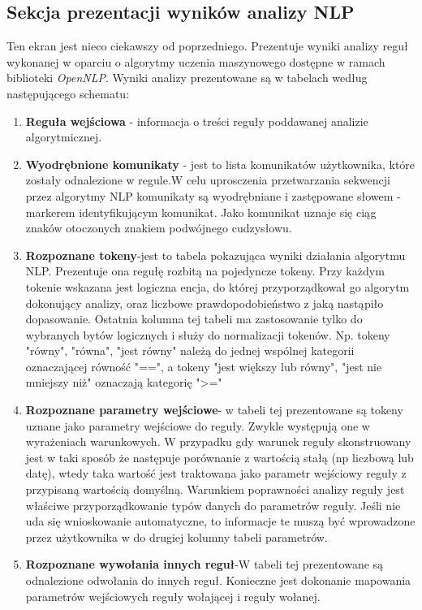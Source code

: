 \subsection{Sekcja prezentacji wyników analizy NLP}
Ten ekran jest nieco ciekawszy od poprzedniego. Prezentuje wyniki analizy reguł wykonanej w
oparciu o algorytmy uczenia maszynowego dostępne w ramach biblioteki \textit{OpenNLP}.
Wyniki analizy prezentowane są w tabelach według następującego schematu:

\begin{enumerate}
	\item \textbf{Reguła wejściowa} - informacja o treści reguły poddawanej analizie algorytmicznej.
	\item	\textbf{Wyodrębnione komunikaty} - jest to lista komunikatów użytkownika, które zostały odnalezione w regule.W celu uprosczenia przetwarzania sekwencji przez algorytmy NLP komunikaty są wyodrębniane i zastępowane
	słowem - markerem identyfikującym komunikat. Jako komunikat uznaje się ciąg znaków otoczonych znakiem podwójnego cudzysłowu.
	\item \textbf{Rozpoznane tokeny}-jest to tabela pokazująca wyniki działania algorytmu NLP. Prezentuje ona regułę rozbitą na pojedyncze tokeny.
	Przy każdym tokenie  wskazana jest logiczna encja, do której przyporządkował go algorytm dokonujący analizy, oraz liczbowe prawdopodobieństwo z jaką nastąpiło dopasowanie.
	Ostatnia kolumna tej tabeli ma zastosowanie tylko do wybranych bytów logicznych i służy do normalizacji tokenów. Np. tokeny "równy", "równa", "jest równy" należą do jednej wspólnej kategorii oznaczającej równość "==", a tokeny "jest większy lub równy", "jest nie mniejszy niż" oznaczają kategorię ">="
	\item \textbf{Rozpoznane parametry wejściowe}- w tabeli tej prezentowane są tokeny uznane jako parametry wejściowe do reguły. Zwykle występują one w wyrażeniach warunkowych.
	W przypadku gdy warunek reguły skonstruowany jest w taki sposób że następuje porównanie z wartością stałą (np liczbową lub datę), wtedy taka wartość jest traktowana jako parametr wejściowy reguły z przypisaną wartością domyślną.
	Warunkiem poprawności analizy reguły jest właściwe przyporządkowanie typów danych do parametrów reguły. Jeśli nie uda się wnioskowanie automatyczne, to informacje te muszą być wprowadzone przez użytkownika w do drugiej kolumny tabeli parametrów.
	\item \textbf{Rozpoznane wywołania innych reguł}-W tabeli tej prezentowane są odnalezione odwołania do innych reguł. Konieczne jest dokonanie mapowania parametrów wejściowych reguły wołającej i reguły wołanej.
\end{enumerate}
